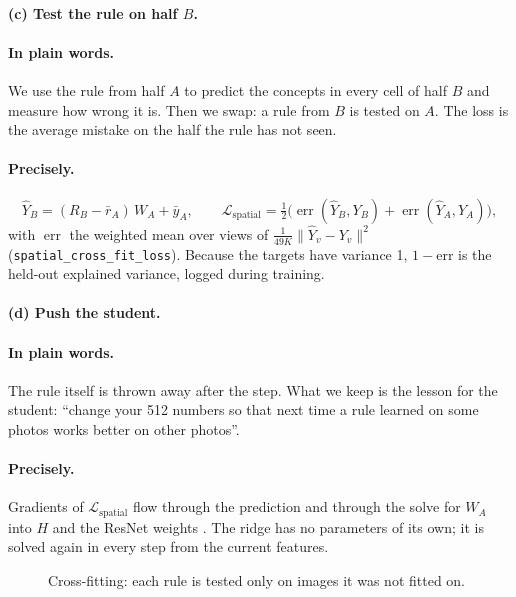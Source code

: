 \documentclass[11pt]{article}
\newcommand{\plain}{\paragraph{In plain words.}}
\newcommand{\precise}{\paragraph{Precisely.}}
\begin{document}
\paragraph{(c) Test the rule on half $B$.}
\plain We use the rule from half $A$ to predict the concepts in every cell of half $B$ and measure how wrong it is. Then
we swap: a rule from $B$ is tested on $A$. The loss is the average mistake on the half the rule has not seen.

\precise
\begin{equation}
\hat Y_B=(R_B-\bar r_A)\,W_A+\bar y_A,\qquad
\mathcal L_{\text{spatial}}=\tfrac12\Big(\operatorname{err}(\hat Y_B,Y_B)+\operatorname{err}(\hat Y_A,Y_A)\Big),
\end{equation}
with $\operatorname{err}$ the weighted mean over views of $\frac1{49K}\lVert\hat Y_v-Y_v\rVert^2$
(\texttt{spatial\_cross\_fit\_loss}). Because the targets have variance 1, $1-\text{err}$ is the held-out explained
variance, logged during training.

\paragraph{(d) Push the student.}
\plain The rule itself is thrown away after the step. What we keep is the lesson for the student: ``change your 512
numbers so that next time a rule learned on some photos works better on other photos''.

\precise Gradients of $\mathcal L_{\text{spatial}}$ flow through the prediction and through the solve for $W_A$ into
$H$ and the ResNet weights \citep{bertinetto2019r2d2}. The ridge has no parameters of its own; it is solved again in
every step from the current features.

\begin{figure}[H]
\centering
{}
\caption{Cross-fitting: each rule is tested only on images it was not fitted on.}
\label{fig:crossfit}
\end{figure}
\end{document}
